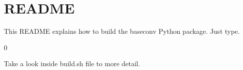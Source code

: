\chapter{README}
\hypertarget{md__2home_2umar_2Desktop_2WorkShop_2GLL_2baseconv_2python-support_2README}{}\label{md__2home_2umar_2Desktop_2WorkShop_2GLL_2baseconv_2python-support_2README}
This README explains how to build the baseconv Python package. Just type. 
\begin{DoxyCode}{0}

\end{DoxyCode}


Take a look inside {\ttfamily build.\+sh} file to more detail. 
